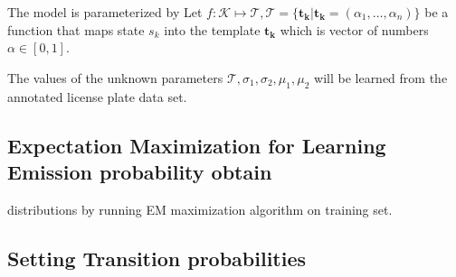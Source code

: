 \documentclass[a4paper,12pt]{article}
\newcounter{ohNoteCounter}
\newcommand{\ohnote}[1]{{\scriptsize  \color{Cgreen} $\clubsuit$~\refstepcounter{ohNoteCounter}\textsf{[OH]$_{\arabic{ohNoteCounter}}$:{#1}}}}
\newcounter{jpNoteCounter}
\newcommand{\jpnote}[1]{{\scriptsize  \color{Cblue} $\blacksquare$ \refstepcounter{jpNoteCounter}\textsf{[JP]$_{\arabic{jpNoteCounter}}$:{#1}}}}
\renewcommand{\jpnote}[1]{}
\renewcommand{\ohnote}[1]{}
\begin{document}
\jpnote{need to talk about how the model enables different
  distributions for each row of each hidden state}

  
The model is parameterized by Let $f : \mathcal{K} \mapsto
\mathcal{T}, \mathcal{T} = \{ \mathbf{t_k} | \mathbf{t_k} = (\alpha_1
, \dots , \alpha_n)\}$ be a function that maps state $s_k$ into the
template $\mathbf{t_k}$ which is vector of numbers $\alpha \in [0,
1]$.

The values of the unknown parameters $\mathcal{T}, \sigma_1, \sigma_2,
\mu_1, \mu_2$ will be learned from the annotated license plate data
set.

  

  \subsection{Expectation Maximization for Learning Emission
    probability obtain}

  
  distributions by running EM maximization algorithm on training set.
 

  

  \ohnote{Describe usage of EM alg.}


  \subsection{Setting Transition probabilities}
\end{document}
